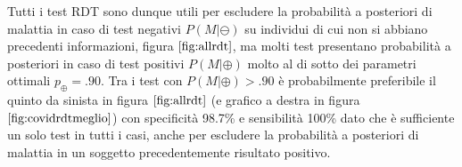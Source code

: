 \documentclass[11pt]{article}
\begin{document}
    
    Tutti i test RDT sono dunque utili per escludere la probabilità a
posteriori di malattia in caso di test negativi \(P(M|\ominus)\) su
individui di cui non si abbiano precedenti informazioni, figura
\(\ref{fig:allrdt}\), ma molti test presentano probabilità a posteriori
in caso di test positivi \(P(M|\oplus)\) molto al di sotto dei parametri
ottimali \(p_{\oplus}=.90\). Tra i test con \(P(M|\oplus)>.90\) è
probabilmente preferibile il quinto da sinista in figura
\(\ref{fig:allrdt}\) (e grafico a destra in figura
\(\ref{fig:covidrdtmeglio}\)) con specificità 98.7\% e sensibilità 100\%
dato che è sufficiente un solo test in tutti i casi, anche per escludere
la probabilità a posteriori di malattia in un soggetto precedentemente
risultato positivo.


    
    



    
\end{document}

